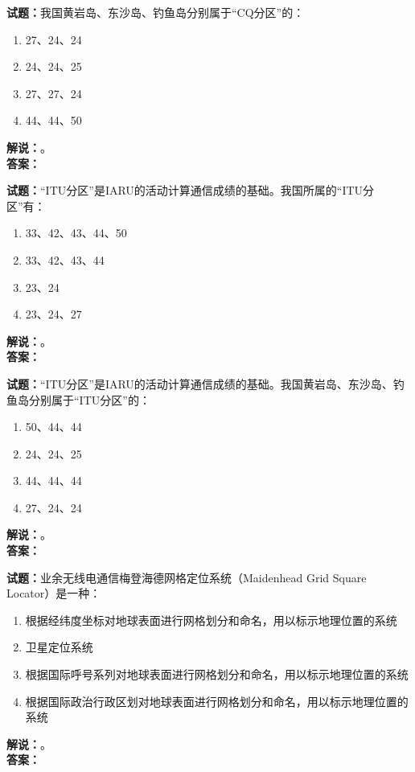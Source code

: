 \documentclass{ctexbook}
\begin{document}
\noindent\textbf{试题：}我国黄岩岛、东沙岛、钓鱼岛分别属于“CQ分区”的：
\begin{enumerate}[leftmargin=3em]
  \item 27、24、24
  \item 24、24、25
  \item 27、27、24
  \item 44、44、50
\end{enumerate}
\noindent\textbf{解说：}\textbf{}。\\\noindent\textbf{答案：}

\bigskip

\noindent\textbf{试题：}“ITU分区”是IARU的活动计算通信成绩的基础。我国所属的“ITU分区”有：
\begin{enumerate}[leftmargin=3em]
  \item 33、42、43、44、50
  \item 33、42、43、44
  \item 23、24
  \item 23、24、27
\end{enumerate}
\noindent\textbf{解说：}\textbf{}。\\\noindent\textbf{答案：}

\bigskip

\noindent\textbf{试题：}“ITU分区”是IARU的活动计算通信成绩的基础。我国黄岩岛、东沙岛、钓鱼岛分别属于“ITU分区”的：
\begin{enumerate}[leftmargin=3em]
  \item 50、44、44
  \item 24、24、25
  \item 44、44、44
  \item 27、24、24
\end{enumerate}
\noindent\textbf{解说：}\textbf{}。\\\noindent\textbf{答案：}

\bigskip

\noindent\textbf{试题：}业余无线电通信梅登海德网格定位系统（Maidenhead Grid Square Locator）是一种：
\begin{enumerate}[leftmargin=3em]
  \item 根据经纬度坐标对地球表面进行网格划分和命名，用以标示地理位置的系统
  \item 卫星定位系统
  \item 根据国际呼号系列对地球表面进行网格划分和命名，用以标示地理位置的系统
  \item 根据国际政治行政区划对地球表面进行网格划分和命名，用以标示地理位置的系统
\end{enumerate}
\noindent\textbf{解说：}\textbf{}。\\\noindent\textbf{答案：}
\end{document}
